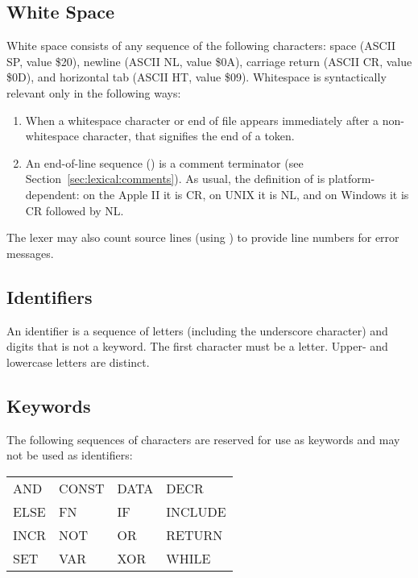 \documentclass[10pt]{article}
\begin{document}
\subsection{White Space}
\label{sec:lexical:white-space}

White space consists of any sequence of the following characters:
space (ASCII SP, value \$20), newline (ASCII NL, value \$0A), carriage
return (ASCII CR, value \$0D), and horizontal tab (ASCII HT, value
\$09).  Whitespace is syntactically relevant only in the following
ways:
%
\begin{enumerate}
%
\item {} When a whitespace character or end of
file appears immediately after a non-whitespace character, that
signifies the end of a token.
%
\item {} An end-of-line sequence () is a
  comment terminator (see Section~\ref{sec:lexical:comments}).  As
  usual, the definition of  is platform-dependent: on the
  Apple II it is CR, on UNIX it is NL, and on Windows it is CR
  followed by NL.
%
\end{enumerate}
%
The lexer may also count source lines (using ) to provide
line numbers for error messages.

\subsection{Identifiers}\label{Identifiers}

An identifier is a sequence of letters (including the underscore
character) and digits that is not a keyword.  The first character must
be a letter.  Upper- and lowercase letters are distinct.

\subsection{Keywords}

The following sequences of characters are reserved for use as keywords
and may not be used as identifiers:
\begin{ttfamily}
\begin{center}
\begin{tabular}{l l l l}
AND & CONST & DATA & DECR \\
%
ELSE & FN & IF & INCLUDE \\
%
INCR & NOT & OR & RETURN \\
%
SET & VAR & XOR & WHILE \\
\end{tabular}
\end{center}
\end{ttfamily}
\end{document}

